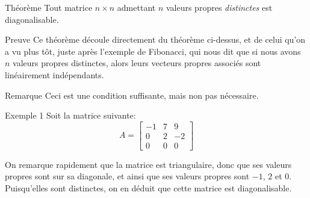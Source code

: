 \documentclass[a4paper]{article}
\begin{document}
\begin{parag}{Théorème}
    Tout matrice $n \times n$ admettant $n$ valeurs propres \textit{distinctes} est diagonalisable.

    \begin{subparag}{Preuve}
       Ce théorème découle directement du théorème ci-dessus, et de celui qu'on a vu plus tôt, juste après l'exemple de Fibonacci, qui nous dit que si nous avons $n$ valeurs propres distinctes, alors leurs vecteurs propres associés sont linéairement indépendants.
    \end{subparag}
    
    \begin{subparag}{Remarque}
        Ceci est une condition suffisante, mais non pas nécessaire.
    \end{subparag}
\end{parag}

\begin{parag}{Exemple 1}
    Soit la matrice suivante: 
    \[A = \begin{bmatrix} -1 & 7 & 9 \\ 0 & 2 & -2 \\ 0 & 0 & 0 \end{bmatrix} \]

    On remarque rapidement que la matrice est triangulaire, donc que ses valeurs propres sont sur sa diagonale, et ainsi que ses valeurs propres sont $-1$, $2$ et $0$. Puisqu'elles sont distinctes, on en déduit que cette matrice est diagonalisable.
\end{parag}
\end{document}
